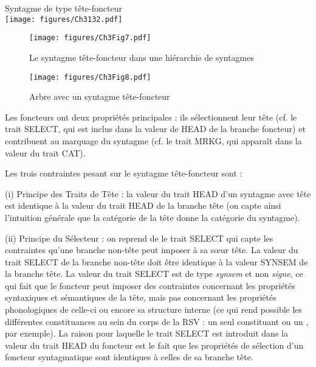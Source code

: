 \ea \label{ch3:ex132}
Syntagme de type tête-foncteur\\
\texttt{[image: figures/Ch3132.pdf]}
 
\z

\begin{figure}[t]
\texttt{[image: figures/Ch3Fig7.pdf]}  
\caption{Le syntagme tête-foncteur dans une hiérarchie de syntagmes}
\label{ch3:fig7}
\end{figure}




\begin{figure}[t]
\texttt{[image: figures/Ch3Fig8.pdf]} %
\caption{Arbre avec un syntagme tête-foncteur}
\label{ch3:fig8}
\end{figure}



Les foncteurs ont deux propriétés principales : ils sélectionnent leur tête (cf. le trait SELECT, qui est inclus dans la valeur de HEAD de la branche foncteur) et contribuent au marquage du syntagme (cf. le trait MRKG, qui apparaît dans la valeur du trait CAT). 

Les trois contraintes pesant sur le syntagme tête-foncteur sont :

(i) Principe des Traits de Tête : la valeur du trait HEAD d’un syntagme avec tête est identique à la valeur du trait HEAD de la branche tête (on capte ainsi l’intuition générale que la catégorie de la tête donne la catégorie du syntagme). 

(ii) Principe du Sélecteur : on reprend de \citet{VanEynde2003,VanEynde2006,VanEynde2007} le trait SELECT qui capte les contraintes qu’une branche non-tête peut imposer à sa sœur tête. La valeur du trait SELECT de la branche non-tête doit être identique à la valeur SYNSEM de la branche tête. La valeur du trait SELECT est de type \textit{synsem} et non \textit{signe}, ce qui fait que le foncteur peut imposer des contraintes concernant les propriétés syntaxiques et sémantiques de la tête, mais pas concernant les propriétés phonologiques de celle-ci ou encore sa structure interne (ce qui rend possible les différentes constituances au sein du corps de la RSV : un seul constituant ou un , par exemple). La raison pour laquelle le trait SELECT est introduit dans la valeur du trait HEAD du foncteur est le fait que les propriétés de sélection d’un foncteur syntagmatique sont identiques à celles de sa branche tête.

